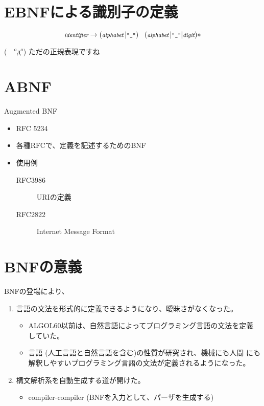 \documentclass[slide,papersize,fleqn]{jsarticle}
\begin{document}
\section{EBNFによる識別子の定義}
\[
\footnotesize
\textit{identifier} \rightarrow (\textit{alphabet}\,|\texttt{"\_"})\quad(\textit{alphabet}\,|\texttt{"\_"}|\textit{digit})*
\]

\tiny
(　$^oд^o$) ただの正規表現ですね
\normalsize
\section{ABNF}
Augmented BNF
\begin{itemize}
\item RFC 5234
\item 各種RFCで、定義を記述するためのBNF
\item 使用例
  \begin{description}
  \item[RFC3986] URIの定義
    \item[RFC2822] Internet Message Format
  \end{description}
\end{itemize}

\section{BNFの意義}
\footnotesize
BNFの登場により、
\begin{enumerate}
\item 言語の文法を形式的に定義できるようになり、曖昧さがなくなった。
  \begin{itemize}
  \item ALGOL60以前は、自然言語によってプログラミング言語の文法を定義
    していた。
  \item 言語 (人工言語と自然言語を含む)の性質が研究され、機械にも人間
    にも解釈しやすいプログラミング言語の文法が定義されるようになった。
  \end{itemize}
\item 構文解析系を自動生成する道が開けた。
  \begin{itemize}
  \item compiler-compiler (BNFを入力として、パーザを生成する)
  \end{itemize}
\end{enumerate}
\end{document}
